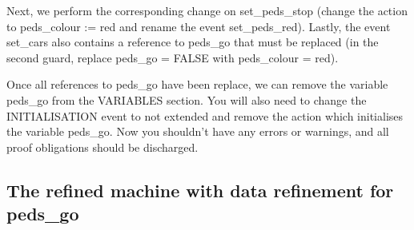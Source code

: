 Next, we perform the corresponding change on \textsf{set\_peds\_stop} (change the action to \textsf{peds\_\-colour := red} and rename the event \textsf{set\_peds\_red}). Lastly, the event \textsf{set\_cars} also contains a reference to \textsf{peds\_go} that must be replaced (in the second guard, replace \textsf{peds\_go = FALSE} with \textsf{peds\_colour = red}).

Once all references to \textsf{peds\_go} have been replace, we can remove the variable \textsf{peds\_go} from the \textsf{VARIABLES} section. You will also need to change the \textsf{INITIALISATION} event to \textsf{not extended} and remove the action which initialises the variable \textsf{peds\_go}. Now you shouldn't have any errors or warnings, and all proof obligations should be discharged.


\subsection{The refined machine with data refinement for peds\_go}
\label{tut_refined_machine}

